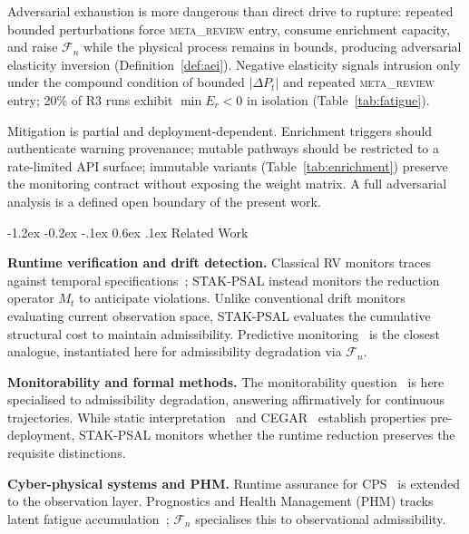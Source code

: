 \documentclass{llncs}
\makeatletter
\renewcommand\section{\@startsection{section}{1}{\z@}%
  {-1.2ex \@plus -0.2ex \@minus -.1ex}%
  {0.6ex \@plus .1ex}%
  {\normalfont\large\bfseries}}
\newcommand{\st}[1]{\textup{\textsc{#1}}}
\makeatother
\begin{document}
Adversarial exhaustion is more dangerous than direct drive to rupture:
repeated bounded perturbations force \st{meta\_review} entry, consume
enrichment capacity, and raise $\mathcal{F}_n$ while the physical
process remains in bounds, producing adversarial elasticity inversion
(Definition~\ref{def:aei}). Negative elasticity signals intrusion only
under the compound condition of bounded $|\Delta P_t|$ and repeated
\st{meta\_review} entry; 20\% of R3 runs exhibit $\min E_r < 0$
in isolation (Table~\ref{tab:fatigue}).

Mitigation is partial and deployment-dependent. Enrichment triggers
should authenticate warning provenance; mutable pathways should be
restricted to a rate-limited API surface; immutable variants
(Table~\ref{tab:enrichment}) preserve the monitoring contract without
exposing the weight matrix. A full adversarial analysis is a defined
open boundary of the present work.

\section{Related Work}
\label{sec:related}

\textbf{Runtime verification and drift detection.}
Classical RV monitors traces against temporal specifications~\cite{leucker2009brief,havelund2018rule}; STAK-PSAL instead monitors the reduction operator $M_t$ to anticipate violations. Unlike conventional drift monitors evaluating current observation space, STAK-PSAL evaluates the cumulative structural cost to maintain admissibility. Predictive monitoring~\cite{zhao2021predictive,chen2009monitoring} is the closest analogue, instantiated here for admissibility degradation via $\mathcal{F}_n$.

\textbf{Monitorability and formal methods.}
The monitorability question~\cite{francalanza2017theory,bauer2011runtime} is here specialised to admissibility degradation, answering affirmatively for continuous trajectories. While static interpretation~\cite{cousot1977abstract} and CEGAR~\cite{clarke2000counterexample} establish properties pre-deployment, STAK-PSAL monitors whether the runtime reduction preserves the requisite distinctions.

\textbf{Cyber-physical systems and PHM.}
Runtime assurance for CPS~\cite{seshia2015towards,schierman2015runtime} is extended to the observation layer. Prognostics and Health Management (PHM) tracks latent fatigue accumulation~\cite{jardine2006review,chiang2014fault}; $\mathcal{F}_n$ specialises this to observational admissibility.
\end{document}

